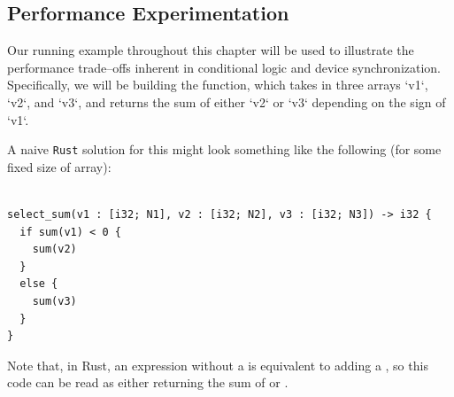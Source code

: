 \subsection{Performance Experimentation}
\label{subsec:separation}

Our running example throughout this chapter will be used to illustrate the performance trade--offs inherent in conditional logic and device synchronization.  Specifically, we will be building the  function, which takes in three arrays `v1`, `v2`, and `v3`, and returns the sum of either `v2` or `v3` depending on the sign of `v1`.

A naive \texttt{Rust} solution for this might look something like the following (for some fixed size of array):
%
\begin{lstlisting}

select_sum(v1 : [i32; N1], v2 : [i32; N2], v3 : [i32; N3]) -> i32 {
  if sum(v1) < 0 {
    sum(v2)
  }
  else {
    sum(v3)
  }
}
\end{lstlisting}
%
Note that, in Rust, an expression without a \code{;} is equivalent to adding a , so this code can be read as either returning the sum of  or .

